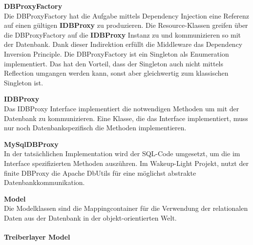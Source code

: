 \documentclass[]{article}
\let\oldparagraph\paragraph
\renewcommand{\paragraph}[1]{\oldparagraph{#1}\mbox{}}
\begin{document}
\textbf{DBProxyFactory}\\
Die DBProxyFactory hat die Aufgabe mittels Dependency Injection eine
Referenz auf einen gültigen \textbf{IDBProxy} zu produzieren. Die
Resource-Klassen greifen über die DBProxyFactory auf die
\textbf{IDBProxy} Instanz zu und kommunizieren so mit der Datenbank.
Dank dieser Indirektion erfüllt die Middleware das Dependency Inversion
Principle. Die DBProxyFactory ist ein Singleton als Enumeration
implementiert. Das hat den Vorteil, dass der Singleton auch nicht
mittels Reflection umgangen werden kann, sonst aber gleichwertig zum
klassischen Singleton ist.

\textbf{IDBProxy}\\
Das IDBProxy Interface implementiert die notwendigen Methoden um mit der
Datenbank zu kommunizieren. Eine Klasse, die das Interface
implementiert, muss nur noch Datenbankspezifisch die Methoden
implementieren.

\textbf{MySqlDBProxy}\\
In der tatsächlichen Implementation wird der SQL-Code umgesetzt, um die
im Interface spezifizierten Methoden auszühren. Im Wakeup-Light Projekt,
nutzt der finite DBProxy die Apache DbUtils für eine möglichst abstrakte
Datenbankkommunikation.

\textbf{Model}\\
Die Modelklassen sind die Mappingcontainer für die Verwendung der
relationalen Daten aus der Datenbank in der objekt-orientierten Welt.

\paragraph{Treiberlayer Model}\label{treiberlayer-model}
\end{document}
